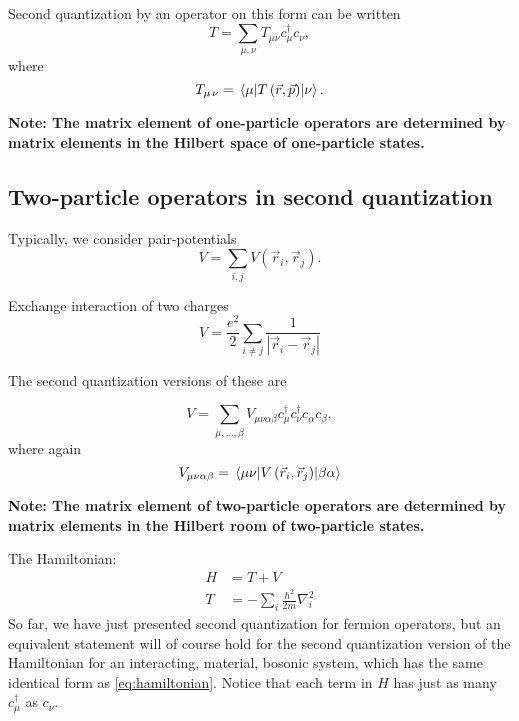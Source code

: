 Second quantization by an operator on this form can be written 
\begin{equation}
T = \sum_{\mu, \nu} T_{\mu\nu}c_\mu^\dagger c_{\nu},
\end{equation}
where
\begin{equation}
T_{\mu\,\nu} = \mel{\mu}{T\left(\vec{r}, \vec{p}\right)}{\nu}.	
\end{equation}

\textbf{Note: The matrix element of one-particle operators are determined by matrix elements in the Hilbert space of one-particle states.}

\subsection{Two-particle operators in second quantization}

Typically, we consider pair-potentials 
\begin{equation}
V = \sum_{i, j} V\left(\vec{r}_i, \vec{r}_j\right).
\end{equation}

\begin{theorem}
Exchange interaction of two charges
\begin{equation}
V = \frac{e^2}{2}\sum_{i\ne j} \frac{1}{|\vec{r}_i - \vec{r}_j|}
\end{equation}
\end{theorem}

The second quantization versions of these are

\begin{equation}
V = \sum_{\mu, \dots, \beta} V_{\mu\nu\alpha\beta}c_{\mu}^\dagger c_{\nu}^\dagger c_{\alpha}c_{\beta},
\end{equation}
where again
\begin{equation}
V_{\mu\nu\alpha\beta} = \mel{\mu\nu}{V\left(\vec{r}_i, \vec{r}_j\right)}{\beta\alpha}
\end{equation}

\textbf{Note: The matrix element of two-particle operators are determined by matrix elements in the Hilbert room of two-particle states.}

The Hamiltonian:
\begin{align}
H &= T + V \label{eq:hamiltonian} \\
T &= -\sum_i \frac{\hbar^2}{2m}\nabla_i^2
\end{align}
So far, we have just presented second quantization for fermion operators, but an equivalent statement will of course hold for the second quantization version of the Hamiltonian for an interacting, material, bosonic system, which has the same identical form as \eqref{eq:hamiltonian}. Notice that each term in $H$ has just as many $c_\mu^\dagger$ as $c_{\nu}$.


